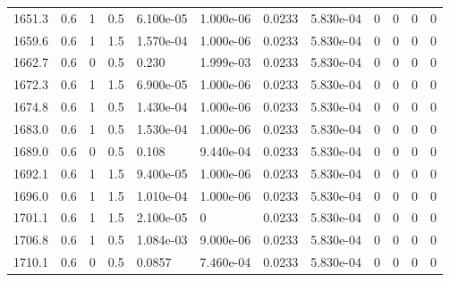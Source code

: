 \documentclass[preview]{standalone}
\begin{document}
{{{{{{{{\begin{tabular}{L{1.2cm}C{1.2cm} C{0.3cm}C{0.5cm} C{1.4cm}C{1.4cm} C{1.4cm}C{1.4cm} C{1.6cm}C{1.6cm} C{1.6cm}C{1.6cm}}
  1651.3  &   0.6  & 1     & 0.5 &  6.100e-05  & 1.000e-06  &  0.0233&   5.830e-04& 0 & 0   &  0 & 0  \\ 
  1659.6  &   0.6  & 1     & 1.5 &  1.570e-04  & 1.000e-06  &  0.0233&   5.830e-04& 0 & 0   &  0 & 0  \\ 
  1662.7  &   0.6  & 0     & 0.5 &  0.230  & 1.999e-03  &  0.0233&   5.830e-04& 0 & 0   &  0 & 0  \\ 
  1672.3  &   0.6  & 1     & 1.5 &  6.900e-05  & 1.000e-06  &  0.0233&   5.830e-04& 0 & 0   &  0 & 0  \\ 
  1674.8  &   0.6  & 1     & 0.5 &  1.430e-04  & 1.000e-06  &  0.0233&   5.830e-04& 0 & 0   &  0 & 0  \\ 
  1683.0  &   0.6  & 1     & 0.5 &  1.530e-04  & 1.000e-06  &  0.0233&   5.830e-04& 0 & 0   &  0 & 0  \\ 
  1689.0  &   0.6  & 0     & 0.5 &  0.108  & 9.440e-04  &  0.0233&   5.830e-04& 0 & 0   &  0 & 0  \\ 
  1692.1  &   0.6  & 1     & 1.5 &  9.400e-05  & 1.000e-06  &  0.0233&   5.830e-04& 0 & 0   &  0 & 0  \\ 
  1696.0  &   0.6  & 1     & 1.5 &  1.010e-04  & 1.000e-06  &  0.0233&   5.830e-04& 0 & 0   &  0 & 0  \\ 
  1701.1  &   0.6  & 1     & 1.5 &  2.100e-05  & 0  &  0.0233&   5.830e-04& 0 & 0   &  0 & 0  \\ 
  1706.8  &   0.6  & 1     & 0.5 &  1.084e-03  & 9.000e-06  &  0.0233&   5.830e-04& 0 & 0   &  0 & 0  \\ 
  1710.1  &   0.6  & 0     & 0.5 &  0.0857  & 7.460e-04  &  0.0233&   5.830e-04& 0 & 0   &  0 & 0  \\ 
\hline 
\end{tabular} 

}}}}}}}}
\end{document}
